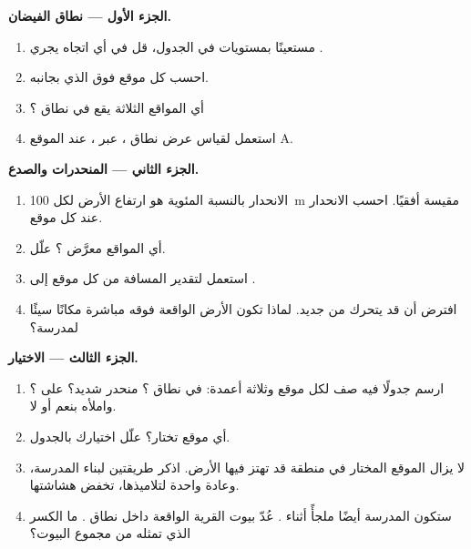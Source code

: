 \begin{problem}
\noindent\textbf{الجزء الأول --- نطاق الفيضان.}\par\nopagebreak
\begin{enumerate}[beginpenalty=10000]
  \item مستعينًا بمستويات  في الجدول، قل في أي اتجاه يجري
        .
  \item احسب  كل موقع فوق  الذي بجانبه.
  \item أي المواقع الثلاثة يقع في نطاق ؟
  \item استعمل  لقياس عرض نطاق ، عبر ، عند
        الموقع A.
\end{enumerate}

\noindent\textbf{الجزء الثاني --- المنحدرات والصدع.}\par\nopagebreak
\begin{enumerate}[resume, beginpenalty=10000]
  \item الانحدار بالنسبة المئوية هو ارتفاع الأرض لكل \qty{100}{m} مقيسة
        أفقيًا. احسب الانحدار عند كل موقع.
  \item أي المواقع معرَّض ؟ علّل.
  \item استعمل  لتقدير المسافة من كل موقع إلى .
  \item افترض أن  قد يتحرك من جديد. لماذا تكون الأرض الواقعة فوقه
        مباشرة مكانًا سيئًا لمدرسة؟
\end{enumerate}

\noindent\textbf{الجزء الثالث --- الاختيار.}\par\nopagebreak
\begin{enumerate}[resume, beginpenalty=10000]
  \item ارسم جدولًا فيه صف لكل موقع وثلاثة أعمدة: في نطاق ؟
        منحدر شديد؟ على ؟ واملأه بنعم أو لا.
  \item أي موقع تختار؟ علّل اختيارك بالجدول.
  \item لا يزال الموقع المختار في منطقة قد تهتز فيها الأرض. اذكر طريقتين لبناء
        المدرسة، وعادة واحدة لتلاميذها، تخفض هشاشتها.
  \item ستكون المدرسة أيضًا ملجأً أثناء . عُدّ بيوت القرية الواقعة داخل
        نطاق . ما الكسر الذي تمثله من مجموع
        البيوت؟
\end{enumerate}
\end{problem}

